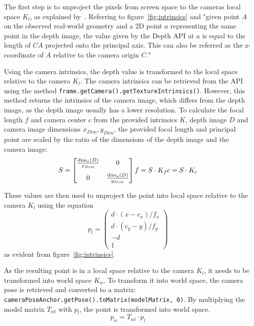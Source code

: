 The first step is to unproject the pixels from screen space to the cameras local space $K_l$, as explained by~\cite{google_llc_codelab_raw_depth, google_llc_arcore_doc}.
Referring to figure~\ref{fig:intrinsics} and
"given point $A$ on the observed real-world geometry and a 2D point $a$ representing the same point in the depth image,
the value given by the Depth API at $a$ is equal to the length of $CA$ projected onto the principal axis.
This can also be referred as the z-coordinate of $A$ relative to the camera origin $C$."~\parencite{google_llc_arcore_doc}

Using the camera intrinsics, the depth value is transformed to the local space relative to the camera $K_l$.
The camera intrinsics can be retrieved from the API using the method \texttt{frame.getCamera().getTextureIntrinsics()}.
However, this method returns the intrinsics of the camera image, which differs from the depth image, as the depth image usually has a lower resolution.
To calculate the focal length $f$ and camera center $c$ from the provided intrinsics $K$, depth image $D$ and camera image dimensions $x_{Dim}, y_{Dim}$,
the provided focal length and principal point are scaled by the ratio of the dimensions of the depth image and the camera image:
\begin{equation}
    S = \begin{bmatrix}
            \frac{\dim_x(D)}{x_{Dim}} & 0\\[8pt]
            0                         & \frac{\dim_y(D)}{y_{Dim}}
    \end{bmatrix}\\
    f = S \cdot K_f \\
    c = S \cdot K_c
\end{equation}

These values are then used to unproject the point into local space relative to the camera $K_l$ using the equation
\begin{equation}
    p_l = \begin{pmatrix}
              d \cdot (x - c_x) / f_x \\
              d \cdot (c_y - y) / f_y \\
              -d                      \\
              1
    \end{pmatrix}
\end{equation}
as evident from figure~\ref{fig:intrinsics}.

As the resulting point is in a local space relative to the camera $K_l$, it needs to be transformed into world space $K_w$.
To transform it into world space, the camera pose is retrieved and converted to a matrix:
\texttt{cameraPoseAnchor.getPose().toMatrix(modelMatrix, 0)}.
By multiplying the model matrix $T_{wl}$ with $p_l$, the point is transformed into world space.
\begin{equation}
    p_w = T_{wl} \cdot p_l
\end{equation}

